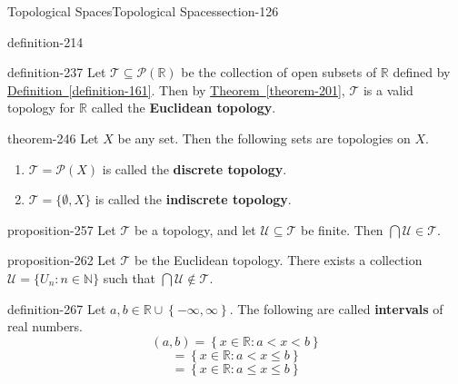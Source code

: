 \documentclass[oneside,10pt,]{article}
\newcommand{\terminology}[1]{\textbf{#1}}
\newcommand{\mb}{\mathbb}
\newcommand{\mc}{\mathcal}
\newcommand{\setBuilder}[2]{\left\{#1:#2\right\}}
\newcommand{\setList}[1]{\left\{#1\right\}}
\newcommand{\lt}{<}
\begin{document}
\begin{sectionptx}{Topological Spaces}{}{Topological Spaces}{}{}{section-126}
\begin{definition}{}{definition-214}
\end{definition}
\begin{definition}{}{definition-237}%
\hypertarget{p-238}{}%
Let \(\mc T\subseteq\mc P(\mb R)\) be the collection of open subsets of \(\mb R\) defined by \hyperref[definition-161]{Definition~\ref{definition-161}}. Then by \hyperref[theorem-201]{Theorem~\ref{theorem-201}}, \(\mc T\) is a valid topology for \(\mb R\) called the \terminology{Euclidean topology}.%
\end{definition}
\begin{theorem}{}{}{theorem-246}%
\hypertarget{p-247}{}%
Let \(X\) be any set. Then the following sets are topologies on \(X\).%
\leavevmode%
\begin{enumerate}
\item\hypertarget{li-251}{}\(\mc T=\mc P(X)\) is called the \terminology{discrete topology}.%
\item\hypertarget{li-254}{}\(\mc T=\{\emptyset,X\}\) is called the \terminology{indiscrete topology}.%
\end{enumerate}
\end{theorem}
\begin{proposition}{}{}{proposition-257}%
\hypertarget{p-258}{}%
Let \(\mc T\) be a topology, and let \(\mc U\subseteq\mc T\) be finite. Then \(\bigcap\mc U\in\mc T\).%
\end{proposition}
\begin{proposition}{}{}{proposition-262}%
\hypertarget{p-263}{}%
Let \(\mc T\) be the Euclidean topology. There exists a collection \(\mc U=\{U_n:n\in\mb N\}\) such that \(\bigcap\mc U\not\in\mc T\).%
\end{proposition}
\begin{definition}{}{definition-267}%
\hypertarget{p-268}{}%
Let \(a,b\in\mb R\cup\setList{-\infty,\infty}\). The following are called \terminology{intervals} of real numbers.%
%
\begin{equation*}
(a,b)=\setBuilder{x\in\mb R}{a\lt x\lt b}
\end{equation*}
%
\begin{equation*}
[a,b)=\setBuilder{x\in\mb R}{a\leq x\lt b}
\end{equation*}
%
\begin{equation*}
(a,b]=\setBuilder{x\in\mb R}{a\lt x\leq b}
\end{equation*}
%
\begin{equation*}
[a,b]=\setBuilder{x\in\mb R}{a\leq x\leq b}
\end{equation*}
\end{definition}

\end{sectionptx}
\end{document}

